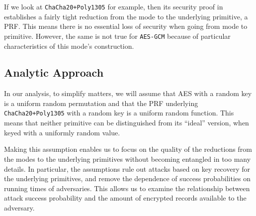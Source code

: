 \documentclass{article}
\begin{document}
If we look at \texttt{ChaCha20+Poly1305} for example, then its security proof in~\cite{DBLP:journals/iacr/Procter14a} establishes a fairly tight reduction from the mode to the underlying primitive, a PRF. This means there is no essential loss of security when going from mode to primitive. 
However, the same is not true for \texttt{AES-GCM} because of particular characteristics of this mode's construction.




\subsection{Analytic Approach}
In our analysis, to simplify matters, we will assume that AES with a random key is a uniform random permutation and that the PRF underlying \texttt{ChaCha20+Poly1305} with a random key is a uniform random function. This means that neither primitive can be distinguished from its ``ideal'' version, when keyed with a uniformly random value. %

Making this assumption enables us to focus on the quality of the reductions from the modes to the underlying primitives without becoming entangled in too many details. In particular, the assumptions rule out attacks based on key recovery for the underlying primitives, and remove the dependence of success probabilities on running times of adversaries. This allows us to examine the relationship between attack success probability and the amount of encrypted records available to the adversary.
\end{document}

